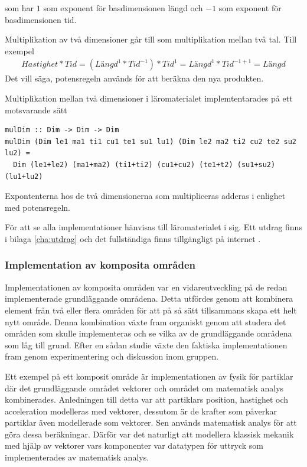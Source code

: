 \begin{draft}
som har $1$ som exponent för basdimensionen längd och $-1$ som exponent för
basdimensionen tid.

Multiplikation av två dimensioner går till som multiplikation mellan två tal.
Till exempel \begin{align*}
  Hastighet * Tid = (Längd^1 * Tid^{-1}) * Tid^1 = Längd^1 * Tid^{-1 + 1} =
  Längd \end{align*}
Det vill säga, potensregeln används för att beräkna den nya produkten.

Multiplikation mellan två dimensioner i läromaterialet implemtentarades på ett
motsvarande sätt

\begin{lstlisting}[frame=none, belowskip=-0.5\baselineskip, xleftmargin=0.5in]
mulDim :: Dim -> Dim -> Dim
mulDim (Dim le1 ma1 ti1 cu1 te1 su1 lu1) (Dim le2 ma2 ti2 cu2 te2 su2 lu2) =
  Dim (le1+le2) (ma1+ma2) (ti1+ti2) (cu1+cu2) (te1+t2) (su1+su2) (lu1+lu2)
\end{lstlisting}

Expontenterna hos de två dimensionerna som multipliceras adderas i enlighet med
potensregeln.

För att se alla implementationer hänvisas till läromaterialet i sig. Ett utdrag
finns i bilaga \ref{cha:utdrag} och det fullständiga finns tillgängligt på internet \cite{LYAP}.

\subsubsection{Implementation av komposita områden}

Implementationen av komposita områden var en vidareutveckling på de redan
implementerade grundläggande områdena. Detta utfördes genom att kombinera
element från två eller flera områden för att på så sätt tillsammans skapa ett
helt nytt område. Denna kombination växte fram organiskt genom att studera det
områden som skulle implementeras och se vilka av de grundläggande områdena som
låg till grund. Efter en sådan studie växte den faktiska implementationen fram
genom experimentering och diskussion inom gruppen.

Ett exempel på ett komposit område är implementationen av fysik för partiklar
där det grundläggande området vektorer och området om matematisk analys
kombinerades. Anledningen till detta var att partiklars position, hastighet och
acceleration modelleras med vektorer, dessutom är de krafter som påverkar
partiklar även modellerade som vektorer. Sen används matematisk analys för att
göra dessa beräkningar. Därför var det naturligt att modellera klassisk mekanik
med hjälp av vektorer vars komponenter var datatypen för uttryck som
implementerades av matematisk analys.


\end{draft}
